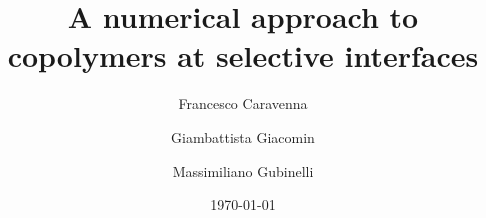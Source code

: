 \documentclass[reqno,11pt]{amsart}
\numberwithin{equation}{section}
\begin{document}
\title[Copolymers at selective interfaces]{
A numerical approach to
\\
 copolymers at selective interfaces
}

\author{Francesco Caravenna}

\address{Universit\`a di Milano-Bicocca, Dipartimento di Matematica e Applicazioni, \mbox{Edificio} U5,\break via Cozzi 53, 20125 Milano, Italy \hfill \break
\indent \textit{and} \hfill\break
\indent Laboratoire de Probabilit{\'e}s de P 6 \& 7 (CNRS U.M.R. 7599)
and  Universit{\'e} Paris 7 -- Denis Diderot,
U.F.R. Mathematiques, Case 7012, 2 place Jussieu, 75251 Paris cedex 05, France}


\author{Giambattista Giacomin}
\address{Laboratoire de Probabilit{\'e}s de P 6\ \& 7 (CNRS U.M.R. 7599)
  and  Universit{\'e} Paris 7 -- Denis Diderot,
U.F.R.                Mathematiques, Case 7012,
                2 place Jussieu, 75251 Paris cedex 05, France
\hfill\break
{}
{\tt http://www.proba.jussieu.fr/pageperso/giacomin/GBpage.html}}

\author{Massimiliano Gubinelli}
\address{Dipartimento di Matematica Applicata ``U.~Dini'',
Universit\`a di Pisa, via Bonanno Pisano 25b, 56126 Pisa, Italy}

\date{\today}
\end{document}
